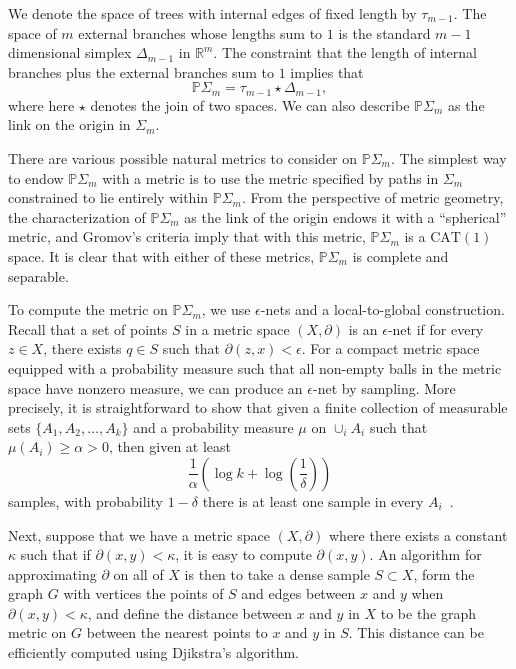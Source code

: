 \documentclass[a4paper,11pt]{article}
\newcommand{\CAT}{\textrm{CAT}}
\begin{document}
We denote the space of trees with internal edges of fixed length by $\tau_{m-1}$.
The space of $m$ external branches whose lengths sum to $1$ is the standard $m-1$ dimensional simplex $\Delta_{m-1}$ in $\mathbb{R}^m$.
The constraint that the length of internal branches plus the external branches sum to $1$ implies that \[\mathbb{P}\Sigma_m = \tau_{m-1} \star \Delta_{m-1},\] where here $\star$ denotes the join of two spaces.
We can also describe $\mathbb{P}\Sigma_m$ as the link on the origin in $\Sigma_m$.

There are various possible natural metrics to consider on $\mathbb{P} \Sigma_m$.
The simplest way to endow $\mathbb{P} \Sigma_m$ with a metric is to use the metric specified by paths in $\Sigma_m$ constrained to lie entirely within $\mathbb{P} \Sigma_m$.
From the perspective of metric geometry, the characterization of $\mathbb{P} \Sigma_m$ as the link of the origin endows it with a ``spherical'' metric, and Gromov's criteria imply that with this metric, $\mathbb{P} \Sigma_m$ is a $\CAT(1)$ space.
It is clear that with either of these metrics, $\mathbb{P} \Sigma_m$ is complete and separable.

To compute the metric on $\mathbb{P}\Sigma_m$, we use $\epsilon$-nets and a local-to-global construction.
Recall that a set of points $S$ in a metric space $(X,\partial)$ is an $\epsilon$-net if for every $z \in X$, there exists $q \in S$ such that $\partial(z,x) < \epsilon$.
For a compact metric space equipped with a probability measure such that all non-empty balls in the metric space have nonzero measure, we can produce an $\epsilon$-net by sampling.
More precisely, it is straightforward to show that given a finite collection of measurable sets $\{A_1, A_2, \ldots, A_k\}$ and a probability measure $\mu$ on $\cup_i A_i$ such that $\mu(A_i) \geq \alpha > 0$, then given at least
\[
\frac{1}{\alpha}\left(\log k + \log(\frac{1}{\delta})\right)
\]
samples, with probability $1-\delta$ there is at least one sample in every $A_i$~\cite[5.1]{niyogi2008finding}.

Next, suppose that we have a metric space $(X,\partial)$ where there exists a constant $\kappa$ such that if $\partial(x,y) < \kappa$, it is easy to compute $\partial(x,y)$.
An algorithm for approximating $\partial$ on all of $X$ is then to take a dense sample $S \subset X$, form the graph $G$ with vertices the points of $S$ and edges between $x$ and $y$ when $\partial(x,y) < \kappa$, and define the distance between $x$ and $y$ in $X$ to be the graph metric on $G$ between the nearest points to $x$ and $y$ in $S$.
This distance can be efficiently computed using Djikstra's algorithm.
\end{document}
